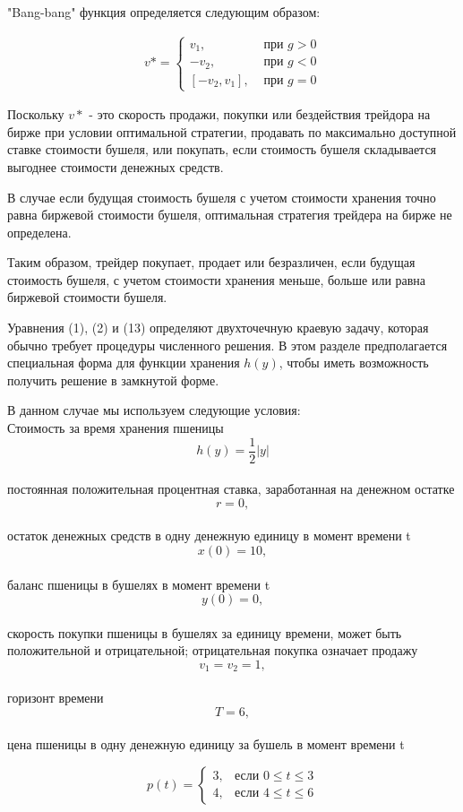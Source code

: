 "Bang-bang" функция определяется следующим образом:


\begin{align}
v* = 
 \begin{cases}
   v_{1}, & \textrm{ при $g>0$}\\
   -v_{2}, &  \textrm{ при $g<0$}\\
   [-v_{2},v_{1}], & \textrm{ при $g=0$}
 \end{cases}
\end{align}

Поскольку ${v*}$ - это скорость продажи, покупки или бездействия трейдора на бирже при условии оптимальной стратегии, продавать по максимально доступной  ставке стоимости бушеля, или покупать, если стоимость бушеля складывается выгоднее стоимости денежных средств.

В случае если будущая стоимость бушеля с учетом стоимости хранения точно равна биржевой стоимости бушеля, оптимальная стратегия трейдера на бирже не определена.

Таким образом, трейдер покупает, продает или безразличен, если будущая стоимость бушеля, с учетом стоимости хранения меньше, больше или равна биржевой стоимости бушеля.

Уравнения (1), (2) и (13) определяют двухточечную краевую задачу, которая обычно требует процедуры численного решения. В этом разделе предполагается специальная форма для функции хранения ${h (y)}$, чтобы иметь возможность получить решение в замкнутой форме.

В данном случае мы используем следующие условия:\\
 Стоимость за время хранения пшеницы $$ {h(y)} = \frac{1}{2}|y|$$\\
постоянная положительная процентная ставка, заработанная на денежном остатке $$ {r} = 0, $$\\
остаток денежных средств в одну денежную единицу в момент времени t $$ {x(0)} = 10, $$\\
баланс пшеницы в бушелях в момент времени t $$ {y(0)} = 0, $$\\
скорость покупки пшеницы в бушелях за единицу времени, может быть положительной и отрицательной; отрицательная покупка означает продажу $$ {v_{1}} = {v_{2}} = 1, $$\\
горизонт времени $$ {T} = 6, $$\\
цена пшеницы в одну денежную единицу за бушель в момент времени t

\begin{displaymath}
p(t) =\left\{ \begin{array}{ll}
 3, & \textrm{если $0 \le t\le 3$}\\
 4, & \textrm{если $4  \le t  \le 6$}
  \end{array} \right.
\end{displaymath}


